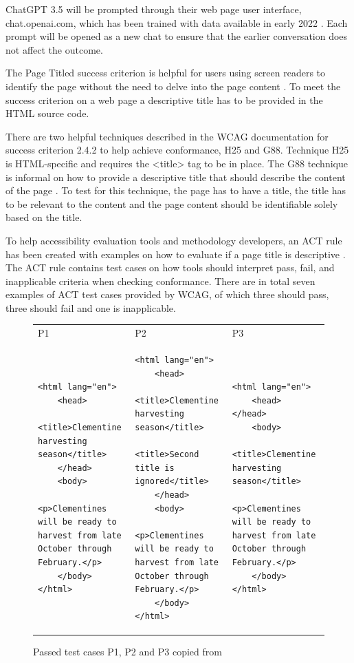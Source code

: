 ChatGPT 3.5 will be prompted through their web page user interface, chat.openai.com, which has been trained with data available in early 2022 \citep{openai_35}. Each prompt will be opened as a new chat to ensure that the earlier conversation does not affect the outcome.

The Page Titled success criterion is helpful for users using screen readers to identify the page without the need to delve into the page content \citep{wcag_page_titled}. To meet the success criterion on a web page a descriptive title has to be provided in the HTML source code. 

There are two helpful techniques described in the WCAG documentation for success criterion 2.4.2 to help achieve conformance, H25 and G88. Technique H25 is HTML-specific and requires the <title> tag to be in place. The G88 technique is informal on how to provide a descriptive title that should describe the content of the page \citep{g88}. To test for this technique, the page has to have a title, the title has to be relevant to the content and the page content should be identifiable solely based on the title.

To help accessibility evaluation tools and methodology developers, an ACT rule has been created with examples on how to evaluate if a page title is descriptive \citep{act_rule_g88}. The ACT rule contains test cases on how tools should interpret pass, fail, and inapplicable criteria when checking conformance. There are in total seven examples of ACT test cases provided by WCAG, of which three should pass, three should fail and one is inapplicable.

\begin{figure}[htbp]
\caption{Passed test cases P1, P2 and P3 copied from \textcite{act_rule_g88}}
\label{passed_cases}
\begin{tabular}{|p{4.9cm}|p{4.9cm}|p{4.9cm}|}
P1 & P2 & P3 \\
\begin{lstlisting}
<html lang="en">
	<head>
		<title>Clementine harvesting season</title>
	</head>
	<body>
		<p>Clementines will be ready to harvest from late October through February.</p>
	</body>
</html>
\end{lstlisting}&
\begin{lstlisting}
<html lang="en">
	<head>
		<title>Clementine harvesting season</title>
		<title>Second title is ignored</title>
	</head>
	<body>
		<p>Clementines will be ready to harvest from late October through February.</p>
	</body>
</html>
\end{lstlisting}&
\begin{lstlisting}
<html lang="en">
	<head> </head>
	<body>
		<title>Clementine harvesting season</title>
		<p>Clementines will be ready to harvest from late October through February.</p>
	</body>
</html>
\end{lstlisting}
\end{tabular}
\end{figure}

